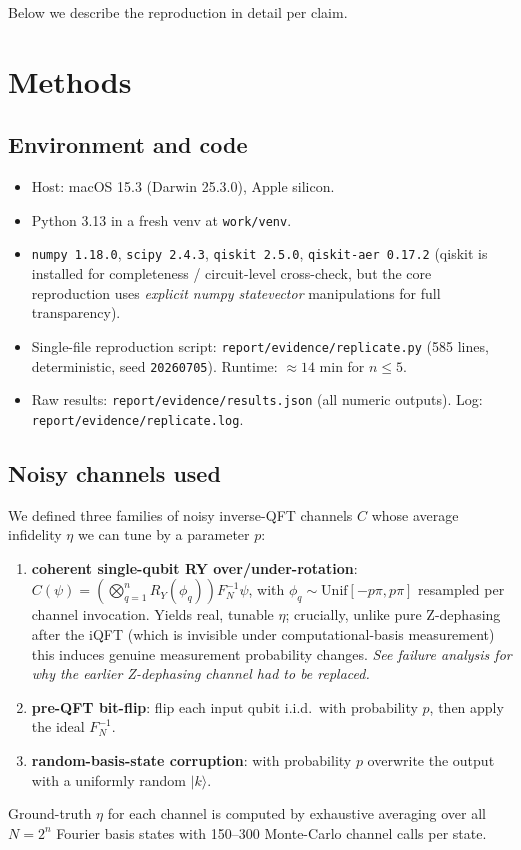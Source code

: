 \documentclass[11pt]{article}
\newcommand{\ket}[1]{\lvert #1 \rangle}
\begin{document}
Below we describe the reproduction in detail per claim.

\section{Methods}

\subsection{Environment and code}
\begin{itemize}
\item Host: macOS 15.3 (Darwin 25.3.0), Apple silicon.
\item Python 3.13 in a fresh venv at \verb|work/venv|.
\item \texttt{numpy 1.18.0}, \texttt{scipy 2.4.3}, \texttt{qiskit 2.5.0},
      \texttt{qiskit-aer 0.17.2} (qiskit is installed for completeness /
      circuit-level cross-check, but the core reproduction uses
      \emph{explicit numpy statevector} manipulations for full
      transparency).
\item Single-file reproduction script:
      \verb|report/evidence/replicate.py| (585 lines, deterministic,
      seed \verb|20260705|).  Runtime: $\approx 14$ min for $n \leq 5$.
\item Raw results: \verb|report/evidence/results.json| (all numeric
      outputs).  Log: \verb|report/evidence/replicate.log|.
\end{itemize}

\subsection{Noisy channels used}
We defined three families of noisy inverse-QFT channels $C$ whose average
infidelity $\eta$ we can tune by a parameter $p$:
\begin{enumerate}
\item \textbf{coherent single-qubit RY over/under-rotation}:
      $C(\psi) = \left(\bigotimes_{q=1}^n R_Y(\phi_q)\right) F_N^{-1} \psi$,
      with $\phi_q \sim \mathrm{Unif}[-p\pi, p\pi]$ resampled per
      channel invocation.  Yields real, tunable $\eta$; crucially,
      unlike pure Z-dephasing after the iQFT (which is invisible under
      computational-basis measurement) this induces genuine measurement
      probability changes.  \emph{See failure analysis for why the
      earlier Z-dephasing channel had to be replaced.}
\item \textbf{pre-QFT bit-flip}: flip each input qubit i.i.d.\ with
      probability $p$, then apply the ideal $F_N^{-1}$.
\item \textbf{random-basis-state corruption}: with probability $p$
      overwrite the output with a uniformly random $\ket{k}$.
\end{enumerate}
Ground-truth $\eta$ for each channel is computed by exhaustive averaging
over all $N=2^n$ Fourier basis states with 150--300 Monte-Carlo channel
calls per state.
\end{document}
